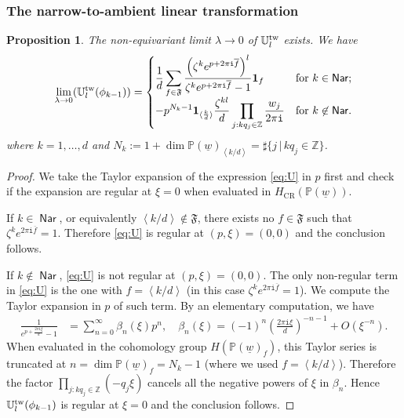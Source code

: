 \documentclass[11pt]{amsart}
\newtheorem{pro}[thm]{Proposition} %
\theoremstyle{definition} %
\theoremstyle{remark} %
\newcommand{\CC}{\mathbb C}
\newcommand{\PP}{\mathbb P}
\newcommand{\UU}{\mathbb U}
\newcommand{\ZZ}{\mathbb Z}
\newcommand{\la}{\lambda}
\newcommand{\tw}{{\rm tw}}
\def\GW{\operatorname{\text{GW}}}
\def\CR{\operatorname{\text{CR}}}
\def\fracp#1{\left\langle #1 \right\rangle}
\newcommand{\cO}{\mathcal{O}}
\newcommand{\frF}{\mathfrak{F}}
\newcommand{\unit}{\boldsymbol{1}}
\newcommand{\Nar}{\operatorname{\mathsf{Nar}}}
\renewcommand{\GW}{{\operatorname{GW}}}
\renewcommand{\CR}{{\operatorname{CR}}}
\newcommand{\ov}{\overline}
\newcommand{\iu}{\mathtt{i}}
\newcommand{\uw}{\underline{w}}
\begin{document}
\subsubsection{The narrow-to-ambient linear transformation} 
\begin{pro} 
\label{pro:noneqlimit-U} 
The non-equivariant limit $\lambda\to 0$ of $\UU_l^\tw$ exists. 
We have 
\[
\lim_{\la\to 0} (\UU^\tw_l(\phi_{k-1})) =  
\begin{cases} 
\displaystyle 
\frac{1}{d} \sum_{f \in \frF}   
\frac{\left(\zeta^{k}e^{p+ 2\pi\iu\ov{f}}\right)^l}
{{\zeta^k e^{p+ 2\pi\iu \ov{f}}-1}} \unit_f
& \text{for $k\in \Nar$;} \\
\displaystyle 
- p^{N_k -1 } 
\unit_{\langle \frac{k}{d} \rangle} 
\frac{\zeta^{kl}}{d}
\prod_{j:kq_j\in \ZZ} \frac{w_j}{2\pi\iu}  
& 
\text{for $k\not\in \Nar$.}
\end{cases} 
\] 
where $k=1,\dots,d$ and 
$N_k := 1 + \dim \PP(\uw)_{\fracp{k/d}}
= \sharp\{j\,|\,k q_j \in \ZZ\}$.  
\end{pro} 
\begin{proof} 
We take the Taylor expansion of the expression \eqref{eq:U} 
in $p$ first and check if the expansion are regular at $\xi=0$ 
when evaluated in $H_{\CR}(\PP(\uw))$.  

If $k\in \Nar$, or equivalently $\fracp{k/d} \notin \frF$, 
there exists no $f\in \frF$ such that $\zeta^k e^{2\pi\iu \ov{f}}=1$. 
Therefore \eqref{eq:U} is regular 
at $(p,\xi)=(0,0)$ 
and the conclusion follows. 

If $k\notin \Nar$, 
\eqref{eq:U} is not regular at $(p,\xi)=(0,0)$. 
The only non-regular term in \eqref{eq:U} is the one with 
$f = \fracp{k/d}$ (in this case $\zeta^k e^{2\pi\iu \ov{f}} =1$). 
We compute the Taylor expansion in $p$ 
of such term. 
By an elementary computation, we have 
\begin{align*} 
\frac{1}{e^{p+\frac{2\pi\iu\xi}{d}} -1} 
& = \sum_{n=0}^\infty \beta_n(\xi)  p^n, \quad 
\beta_n(\xi) = (-1)^n 
\left(\frac{2\pi\iu\xi}{d}\right)^{-n-1} + O(\xi^{-n}).  
\end{align*} 
When evaluated in the cohomology group $H(\PP(\uw)_f)$, 
this Taylor series is truncated at $n=\dim \PP(\uw)_f 
= N_k-1$ 
(where we used $f = \fracp{k/d}$). 
Therefore the factor $\prod_{j:kq_j \in \ZZ} (-q_j \xi)$ 
cancels all the negative powers of $\xi$ in $\beta_n$. 
Hence $\UU^\tw_l(\phi_{k-1})$ is regular at $\xi=0$ 
and the conclusion follows. 
\end{proof} 
\end{document}
